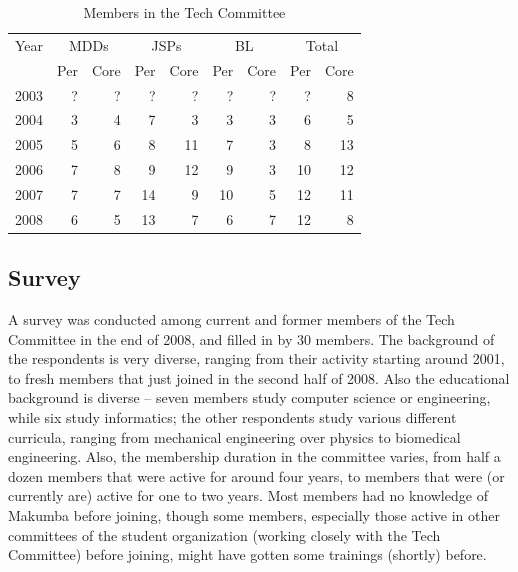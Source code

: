 \documentclass{acm_proc_article-sp}
\begin{document}
\begin{table}
	\centering
	\caption{Members in the Tech Committee}
	\label{tab:itd-members}
	\begin{tabular}{c|r|r|r|r|r|r|r|r|}
		\hline
		\hline
		Year 		& \multicolumn{2}{c|}{MDDs} & \multicolumn{2}{c|}{JSPs}	& \multicolumn{2}{c|}{BL}	& \multicolumn{2}{c|}{Total}	\\
					& Per & Core				& Per & Core				& Per & Core				& Per & Core	\\
		\hline
		\hline
		2003 & ? & ? & ? & ? & ? & ? & ? & 8 \\
		\hline
		2004 & 3 & 4 & 7 & 3 & 3 & 3 & 6 & 5 \\
		\hline
		2005 & 5 & 6 & 8 & 11 & 7 & 3 & 8 & 13 \\
		\hline
		2006 & 7 & 8 & 9 & 12 & 9 & 3 & 10 & 12 \\
		\hline
		2007 & 7 & 7 & 14 & 9 & 10 & 5 & 12 & 11 \\
		\hline
		2008 & 6 & 5 & 13 & 7 & 6 & 7 & 12 & 8 \\
		\hline
		\hline
	\end{tabular}
\end{table} 

\subsection{Survey}\label{sec:techCommittee-survey}
A survey was conducted among current and former members of the Tech Committee in the end of 2008, and filled in by 30 members. The background of the respondents is very diverse, ranging from their activity starting around 2001, to fresh members that just joined in the second half of 2008. Also the educational background is diverse -- seven members study computer science or engineering, while six study informatics; the other respondents study various different curricula, ranging from mechanical engineering over physics to biomedical engineering. Also, the membership duration in the committee varies, from half a dozen members that were active for around four years, to members that were (or currently are) active for one to two years. Most members had no knowledge of Makumba before joining, though some members, especially those active in other committees of the student organization (working closely with the Tech Committee) before joining, might have gotten some trainings (shortly) before.
\end{document}
